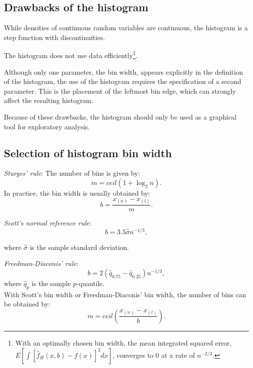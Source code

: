 \subsection{Drawbacks of the histogram}
\begin{asparaenum}[(a)]
\item While densities of continuous random variables are continuous, the histogram is a step function with discontinuities.

\item The histogram does not use data efficiently\footnote{With an optimally chosen bin width, the mean integrated squared error, $E[\int [\hat{f}_H(x,b)-f(x)]^2dx]$, converges to 0 at a rate of $n^{-2/3}$.}.

\item Although only one parameter, the bin width, appears explicitly in the definition of the histogram, the use of the histogram requires the specification of a second parameter. This is the placement of the leftmost bin edge, which can strongly affect the resulting histogram.
\end{asparaenum}
Because of these drawbacks, the histogram should only be used as a graphical tool for exploratory analysis.

\subsection{Selection of histogram bin width}
\begin{asparaenum}[(a)]
\item	{\it Sturges' rule}: The number of bins is given by:
\begin{equation}
m=ceil(1+\log_2n).
\end{equation}
In practice, the bin width is usually obtained by:
\begin{equation}
b=\frac{x_{(n)}-x_{(l)}}{m}.
\end{equation}
\item	{\it Scott's normal reference rule}:
\begin{equation}
b=3.5\hat{\sigma}n^{-1/3},
\end{equation}

where $\hat{\sigma}$ is the sample standard deviation.

\item	{\it Freedman-Diaconis' rule}:
\begin{equation}
b=2(\hat{q}_{0.75}-\hat{q}_{0.25})n^{-1/3},
\end{equation}
where $\hat{q}_p$ is the sample $p$-quantile.\\
With Scott's bin width or Freedman-Diaconis' bin width, the number of bins can be obtained by:
\begin{equation}
m=ceil\left(\frac{x_{(n)}-x_{(l)}}{b}\right).
\end{equation}
\end{asparaenum}

